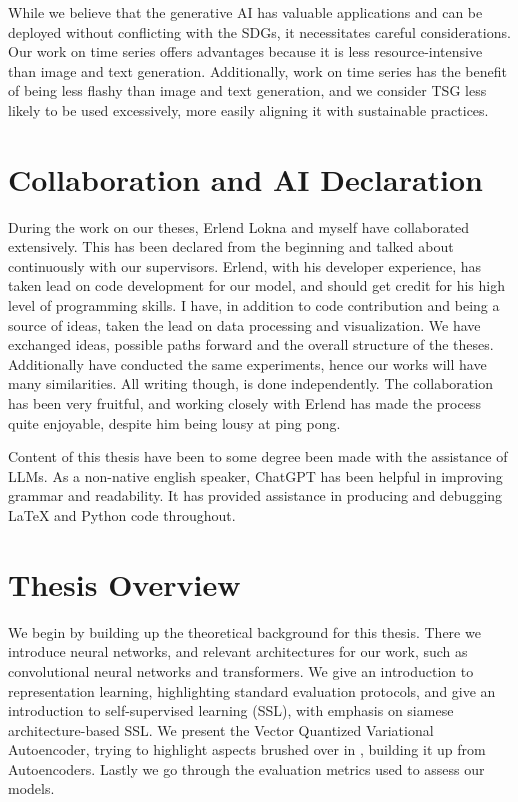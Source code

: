 \documentclass[../../thesis.tex]{subfiles}
\begin{document}
While we believe that the generative AI has valuable applications and can be deployed without conflicting with the SDGs, it necessitates careful considerations. Our work on time series offers advantages because it is less resource-intensive than image and text generation. Additionally, work on time series has the benefit of being less flashy than image and text generation, and we consider TSG less likely to be used excessively, more easily aligning it with sustainable practices.

\section{Collaboration and AI Declaration}

During the work on our theses, Erlend Lokna and myself have collaborated extensively. This has been declared from the beginning and talked about continuously with our supervisors. Erlend, with his developer experience, has taken lead on code development for our model, and should get credit for his high level of programming skills. I have, in addition to code contribution and being a source of ideas, taken the lead on data processing and visualization. We have exchanged ideas, possible paths forward and the overall structure of the theses. Additionally have conducted the same experiments, hence our works will have many similarities. All writing though, is done independently. The collaboration has been very fruitful, and working closely with Erlend has made the process quite enjoyable, despite him being lousy at ping pong. \newline

Content of this thesis have been to some degree been made with the assistance of LLMs. As a non-native english speaker, ChatGPT has been helpful in improving grammar and readability. It has provided assistance in producing and debugging LaTeX and Python code throughout.

\section{Thesis Overview}
We begin by building up the theoretical background for this thesis. There we introduce neural networks, and relevant architectures for our work, such as convolutional neural networks and transformers. We give an introduction to representation learning, highlighting standard evaluation protocols, and give an introduction to self-supervised learning (SSL), with emphasis on siamese architecture-based SSL. We present the Vector Quantized Variational Autoencoder, trying to highlight aspects brushed over in \cite{VQVAE}, building it up from Autoencoders. Lastly we go through the evaluation metrics used to assess our models. \newline
\end{document}
